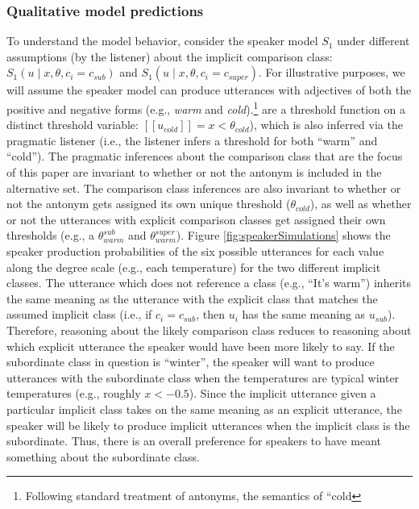 \documentclass[doc]{apa6}
\begin{document}
\subsubsection{Qualitative model
predictions}

To understand the model behavior, consider the speaker model \(S_1\)
under different assumptions (by the listener) about the implicit
comparison class: \(S_{1}(u \mid x, \theta, c_i = c_{sub})\) and
\(S_{1}(u \mid x, \theta, c_i = c_{super})\). For illustrative purposes,
we will assume the speaker model can produce utterances with adjectives
of both the positive and negative forms (e.g., \emph{warm} and
\emph{cold}).\footnote{Following standard treatment of antonyms, the
  semantics of ``cold} are a threshold function on a distinct
  threshold variable: \([\![u_{cold}]\!] = x < \theta_{cold}\)), which
  is also inferred via the pragmatic listener (i.e., the listener infers
  a threshold for both ``warm'' and ``cold''). The pragmatic
  inferences about the comparison class that are the focus of this paper
  are invariant to whether or not the antonym is included in the
  alternative set. The comparison class inferences are also invariant to
  whether or not the antonym gets assigned its own unique threshold
  (\(\theta_{cold}\)), as well as whether or not the utterances with
  explicit comparison classes get assigned their own thresholds (e.g., a
  \(\theta_{warm}^{sub}\) and \(\theta_{warm}^{super}\)). Figure
\ref{fig:speakerSimulations} shows the speaker production probabilities
of the six possible utterances for each value along the degree scale
(e.g., each temperature) for the two different implicit classes. The
utterance which does not reference a class (e.g., ``It's warm'')
inherits the same meaning as the utterance with the explicit class that
matches the assumed implicit class (i.e., if \(c_{i} = c_{sub}\), then
\(u_i\) has the same meaning as \(u_{sub}\)). Therefore, reasoning about
the likely comparison class reduces to reasoning about which explicit
utterance the speaker would have been more likely to say. If the
subordinate class in question is ``winter'', the speaker will want
to produce utterances with the subordinate class when the temperatures
are typical winter temperatures (e.g., roughly \(x < -0.5\)). Since the
implicit utterance given a particular implicit class takes on the same
meaning as an explicit utterance, the speaker will be likely to produce
implicit utterances when the implicit class is the subordinate. Thus,
there is an overall preference for speakers to have meant something
about the subordinate class.
\end{document}
